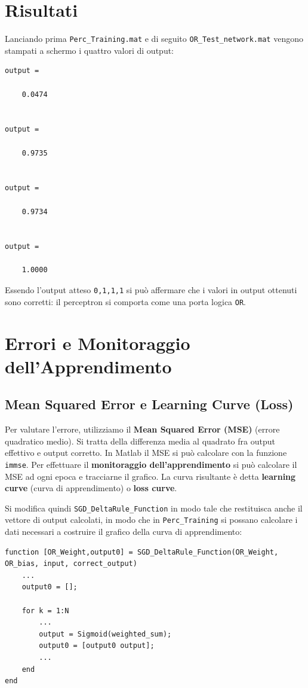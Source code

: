 \documentclass[a4paper,11pt]{article}
\begin{document}
\section{Risultati}

Lanciando prima \texttt{Perc\_Training.mat} e di seguito \texttt{OR\_Test\_network.mat} vengono stampati a schermo i quattro valori di output:

\begin{lstlisting}[style=Matlab-editor]
output =

    0.0474


output =

    0.9735


output =

    0.9734


output =

    1.0000
\end{lstlisting}

Essendo l'output atteso \texttt{0,1,1,1} si può affermare che i valori in output ottenuti sono corretti: il perceptron si comporta come una porta logica \texttt{OR}.


\section{Errori e Monitoraggio dell'Apprendimento}

\subsection{Mean Squared Error e Learning Curve (Loss)}

Per valutare l'errore, utilizziamo il \textbf{Mean Squared Error (MSE)} (errore quadratico medio). Si tratta della differenza media al quadrato fra output effettivo e output corretto. In Matlab il MSE si può calcolare con la funzione \texttt{immse}. Per effettuare il \textbf{monitoraggio dell'apprendimento} si può calcolare il MSE ad ogni epoca e tracciarne il grafico. La curva risultante è detta \textbf{learning curve} (curva di apprendimento) o \textbf{loss curve}.

Si modifica quindi \texttt{SGD\_DeltaRule\_Function} in modo tale che restituisca anche il vettore di output calcolati, in modo che in \texttt{Perc\_Training} si possano calcolare i dati necessari a costruire il grafico della curva di apprendimento:

\begin{lstlisting}[style=Matlab-editor,title=\texttt{SGD\_DeltaRule\_Function.mat}]
function [OR_Weight,output0] = SGD_DeltaRule_Function(OR_Weight, OR_bias, input, correct_output)
    ...
    output0 = [];

	for k = 1:N 
        ...
        output = Sigmoid(weighted_sum);
        output0 = [output0 output];
        ...
	end	
end	
\end{lstlisting}
\end{document}
